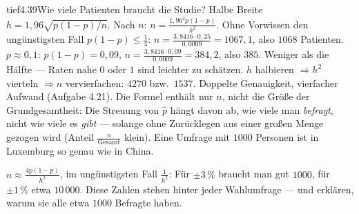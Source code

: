 \begin{loesungkarte}{tief}{4.39}{Wie viele Patienten braucht die Studie?}
Halbe Breite $h = 1{,}96\sqrt{p(1 - p)/n}$. Nach $n$: $n = \frac{1{,}96^{2}p(1 - p)}{h^{2}}$. Ohne Vorwissen den ungünstigsten Fall $p(1 - p)\le\frac14$: $n = \frac{3{,}8416\cdot0{,}25}{0{,}0009} = 1067{,}1$, also $1068$ Patienten.
$p\approx0{,}1$: $p(1 - p) = 0{,}09$, $n = \frac{3{,}8416\cdot0{,}09}{0{,}0009} = 384{,}2$, also $385$. Weniger als die Hälfte --- Raten nahe $0$ oder $1$ sind leichter zu schätzen.
$h$ halbieren $\Rightarrow h^{2}$ vierteln $\Rightarrow n$ vervierfachen: $4270$ bzw.\ $1537$. Doppelte Genauigkeit, vierfacher Aufwand (Aufgabe 4.21).
Die Formel enthält nur $n$, nicht die Größe der Grundgesamtheit: Die Streuung von $\hat p$ hängt davon ab, wie viele man \emph{befragt}, nicht wie viele es \emph{gibt} --- solange ohne Zurücklegen aus einer großen Menge gezogen wird (Anteil $\frac n{\text{Gesamt}}$ klein). Eine Umfrage mit $1000$ Personen ist in Luxemburg so genau wie in China.
\begin{mitnehmen}\kastentext
$n\approx\frac{4p(1 - p)}{h^{2}}$, im ungünstigsten Fall $\frac1{h^{2}}$: Für $\pm3\,\%$ braucht man gut $1000$, für $\pm1\,\%$ etwa $10\,000$. Diese Zahlen stehen hinter jeder Wahlumfrage --- und erklären, warum sie alle etwa $1000$ Befragte haben.
\end{mitnehmen}
\end{loesungkarte}

